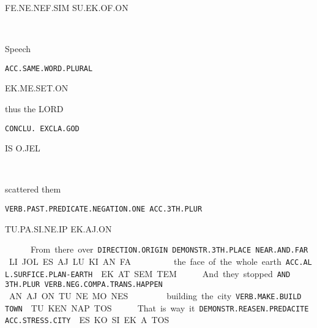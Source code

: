 {{FE.NE.NEF.SIM			SU.EK.OF.ON	 

\fe\Atlanne\nef\Atlansim~\su\ek\of\on
\drie

  

Speech 

{\tt ACC.SAME.WORD.PLURAL }

EK.ME.SET.ON 

\ek\me\set\on
\drie

 

thus 		the LORD 					

{\tt CONCLU.	EXCLA.GOD					 }

IS		O.JEL		 

\is~\Atlano\jel 
\drie

 

scattered				them 

{\tt VERB.PAST.PREDICATE.NEGATION.ONE	ACC.3TH.PLUR }

TU.PA.SI.NE.IP				EK.AJ.ON 

\tu\pa\si\Atlanne\ip~\ek\aj\on
\drie

 

From 			there 			over 		

{\tt DIRECTION.ORIGIN         DEMONSTR.3TH.PLACE  NEAR.AND.FAR }

LI.JOL			ES.AJ.LU		KI.AN.FA	 

\li\jol~\es\aj\lu~\ki\an\fa
\drie
 

 

the face of the whole earth 

{\tt ACC.ALL.SURFICE.PLAN-EARTH }

EK.AT.SEM.TEM 

\ek\at\sem\tem
\drie

 

And 	they 		stopped 				 

{\tt AND	3TH.PLUR	VERB.NEG.COMPA.TRANS.HAPPEN	 }

AN	AJ.ON		TU.NE.MO.NES		                               

\an~\aj\on~\tu\Atlanne\mo\nes
\drie
 

building 		the city 

{\tt VERB.MAKE.BUILD	TOWN }

TU.KEN.NAP                      TOS 

\tu\ken\nap~\tos
\drie

 

That is way 				it 			

{\tt DEMONSTR.REASEN.PREDACITE	ACC.STRESS.CITY	 }

ES.KO.SI				EK.A.TOS		 

}}
